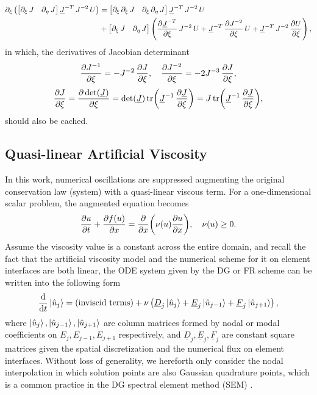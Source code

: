 \documentclass[10pt]{article}
\begin{document}
$$
\begin{aligned}\partial_{\xi}\left(\mathinner{\begin{bmatrix}\partial_{\xi}\,J & \partial_{\eta}\,J\end{bmatrix}}\underline{J}^{-T}\,J^{-2}\,U\right) & =\mathinner{\begin{bmatrix}\partial_{\xi}\,\partial_{\xi}\,J & \partial_{\xi}\,\partial_{\eta}\,J\end{bmatrix}}\underline{J}^{-T}\,J^{-2}\,U\\
 & +\mathinner{\begin{bmatrix}\partial_{\xi}\,J & \partial_{\eta}\,J\end{bmatrix}}\left(\pdv{\underline{J}^{-T}}{\xi}\,J^{-2}\,U+\underline{J}^{-T}\,\pdv{J^{-2}}{\xi}\,U+\underline{J}^{-T}\,J^{-2}\,\pdv{U}{\xi}\right),
\end{aligned}
$$
in which, the derivatives of Jacobian determinant
$$
\pdv{J^{-1}}{\xi}=-J^{-2}\,\pdv{J}{\xi},\quad\pdv{J^{-2}}{\xi}=-2J^{-3}\,\pdv{J}{\xi},
$$
$$
\pdv{J}{\xi}=\pdv{\det(\underline{J})}{\xi}=\det(\underline{J})\tr(\underline{J}^{-1}\,\pdv{\underline{J}}{\xi})=J\tr(\underline{J}^{-1}\,\pdv{\underline{J}}{\xi}),
$$
should also be cached.

\subsection{Quasi-linear Artificial Viscosity}
In this work, numerical oscillations are suppressed augmenting the original conservation law (system) with a quasi-linear viscous term.
For a one-dimensional scalar problem, the augmented equation becomes
$$
\pdv{u}{t}+\pdv{f(u)}{x}=\pdv{x}\qty(\nu(u)\pdv{u}{x}),\quad \nu(u) \ge 0.
$$
%
Assume the viscosity value is a constant across the entire domain,
and recall the fact that the artificial viscosity model and the numerical scheme for it on element interfaces are both linear,
the ODE system given by the DG or FR scheme can be written into the following form
$$
\dv{t}\ket{\hat{u}_{j}}=(\text{inviscid terms})+\nu\left(\underline{D}_{j}\ket{\hat{u}_{j}}+\underline{E}_{j}\ket{\hat{u}_{j-1}}+\underline{F}_{j}\ket{\hat{u}_{j+1}}\right),
$$
where $\ket{\hat{u}_{j}}, \ket{\hat{u}_{j-1}}, \ket{\hat{u}_{j+1}}$ are column matrices formed by nodal or modal coefficients on $E_{j}, E_{j-1}, E_{j+1}$ respectively, and $ \underline{D}_{j}, \underline{E}_{j}, \underline{F}_{j} $ are constant square matrices given the spatial discretization and the numerical flux on element interfaces.
%
Without loss of generality, we hereforth only consider the nodal interpolation in which solution points are also Gaussian quadrature points, which is a common practice in the DG spectral element method (SEM) \cite{Kopriva_2009,Li_2020}.
%
\end{document}

